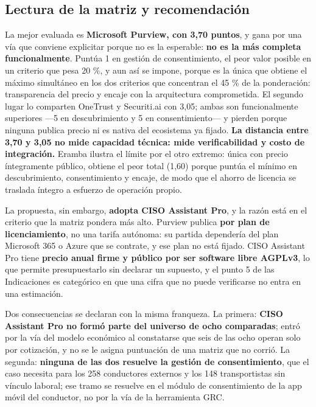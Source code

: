 \subsection{Lectura de la matriz y recomendación}\label{lectura-de-la-matriz-y-recomendaciuxf3n}

La mejor evaluada es \textbf{Microsoft Purview, con 3,70 puntos}, y gana por una vía que conviene explicitar porque no es la esperable: \textbf{no es la más completa funcionalmente}. Puntúa 1 en gestión de consentimiento, el peor valor posible en un criterio que pesa 20 \%, y aun así se impone, porque es la única que obtiene el máximo simultáneo en los dos criterios que concentran el 45 \% de la ponderación: transparencia del precio y encaje con la arquitectura comprometida. El segundo lugar lo comparten OneTrust y Securiti.ai con 3,05; ambas son funcionalmente superiores ---5 en descubrimiento y 5 en consentimiento--- y pierden porque ninguna publica precio ni es nativa del ecosistema ya fijado. \textbf{La distancia entre 3,70 y 3,05 no mide capacidad técnica: mide verificabilidad y costo de integración.} Eramba ilustra el límite por el otro extremo: única con precio íntegramente público, obtiene el peor total (1,60) porque puntúa el mínimo en descubrimiento, consentimiento y encaje, de modo que el ahorro de licencia se traslada íntegro a esfuerzo de operación propio.

La propuesta, sin embargo, \textbf{adopta CISO Assistant Pro}, y la razón está en el criterio que la matriz pondera más alto. Purview publica \textbf{por plan de licenciamiento}, no una tarifa autónoma: su partida dependería del plan Microsoft 365 o Azure que se contrate, y ese plan no está fijado. CISO Assistant Pro tiene \textbf{precio anual firme y público por ser software libre AGPLv3}, lo que permite presupuestarlo sin declarar un supuesto, y el punto 5 de las Indicaciones es categórico en que una cifra que no puede verificarse no entra en una estimación.

Dos consecuencias se declaran con la misma franqueza. La primera: \textbf{CISO Assistant Pro no formó parte del universo de ocho comparadas}; entró por la vía del modelo económico al constatarse que seis de las ocho operan solo por cotización, y no se le asigna puntuación de una matriz que no corrió. La segunda: \textbf{ninguna de las dos resuelve la gestión de consentimiento}, que el caso necesita para los 258 conductores externos y los 148 transportistas sin vínculo laboral; ese tramo se resuelve en el módulo de consentimiento de la app móvil del conductor, no por la vía de la herramienta GRC.

